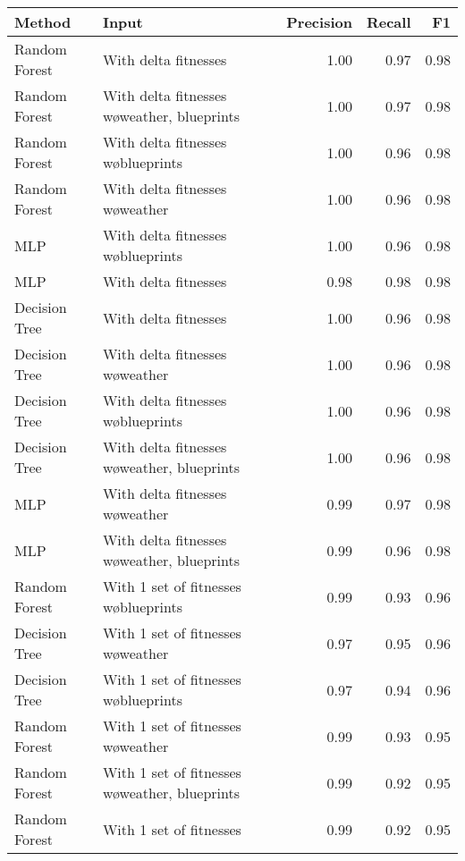 \begin{tabular}{llrrr}
\toprule
        Method &                                           Input &  Precision &  Recall &   F1 \\
\midrule
 Random Forest &                            With delta fitnesses &       1.00 &    0.97 & 0.98 \\
 Random Forest &    With delta fitnesses w\o weather, blueprints &       1.00 &    0.97 & 0.98 \\
 Random Forest &             With delta fitnesses w\o blueprints &       1.00 &    0.96 & 0.98 \\
 Random Forest &                With delta fitnesses w\o weather &       1.00 &    0.96 & 0.98 \\
           MLP &             With delta fitnesses w\o blueprints &       1.00 &    0.96 & 0.98 \\
           MLP &                            With delta fitnesses &       0.98 &    0.98 & 0.98 \\
 Decision Tree &                            With delta fitnesses &       1.00 &    0.96 & 0.98 \\
 Decision Tree &                With delta fitnesses w\o weather &       1.00 &    0.96 & 0.98 \\
 Decision Tree &             With delta fitnesses w\o blueprints &       1.00 &    0.96 & 0.98 \\
 Decision Tree &    With delta fitnesses w\o weather, blueprints &       1.00 &    0.96 & 0.98 \\
           MLP &                With delta fitnesses w\o weather &       0.99 &    0.97 & 0.98 \\
           MLP &    With delta fitnesses w\o weather, blueprints &       0.99 &    0.96 & 0.98 \\
 Random Forest &          With 1 set of fitnesses w\o blueprints &       0.99 &    0.93 & 0.96 \\
 Decision Tree &             With 1 set of fitnesses w\o weather &       0.97 &    0.95 & 0.96 \\
 Decision Tree &          With 1 set of fitnesses w\o blueprints &       0.97 &    0.94 & 0.96 \\
 Random Forest &             With 1 set of fitnesses w\o weather &       0.99 &    0.93 & 0.95 \\
 Random Forest & With 1 set of fitnesses w\o weather, blueprints &       0.99 &    0.92 & 0.95 \\
 Random Forest &                         With 1 set of fitnesses &       0.99 &    0.92 & 0.95 \\

\end{tabular}
